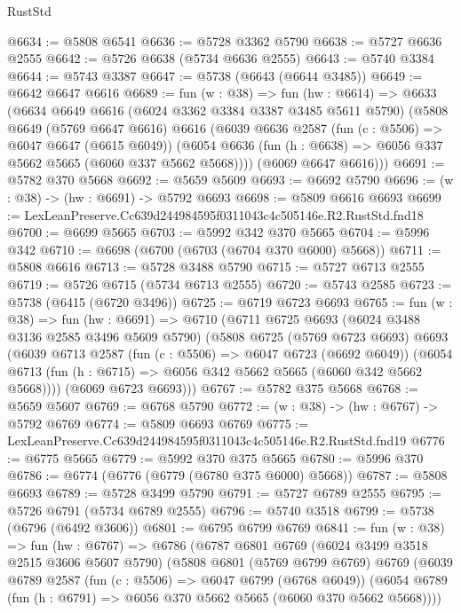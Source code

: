 \begin{lexlean}{RustStd}
\begin{coremodule}
@6634 := @5808 @6541
@6636 := @5728 @3362 @5790
@6638 := @5727 @6636 @2555
@6642 := @5726 @6638 (@5734 @6636 @2555)
@6643 := @5740 @3384
@6644 := @5743 @3387
@6647 := @5738 (@6643 (@6644 @3485))
@6649 := @6642 @6647 @6616
@6689 := fun (w : @38) =>
  fun (hw : @6614) =>
  @6633
    (@6634
      @6649
      @6616
      (@6024 @3362 @3384 @3387 @3485 @5611 @5790)
      (@5808
        @6649
        (@5769 @6647 @6616)
        @6616
        (@6039
          @6636
          @2587
          (fun (c : @5506) => @6047 @6647 (@6615 @6049))
          (@6054 @6636 (fun (h : @6638) => @6056 @337 @5662 @5665 (@6060 @337 @5662 @5668))))
        (@6069 @6647 @6616)))
@6691 := @5782 @370 @5668
@6692 := @5659 @5609
@6693 := @6692 @5790
@6696 := (w : @38) -> (hw : @6691) -> @5792 @6693
@6698 := @5809 @6616 @6693
@6699 := LexLeanPreserve.Cc639d244984595f0311043c4c505146e.R2.RustStd.fnd18
@6700 := @6699 @5665
@6703 := @5992 @342 @370 @5665
@6704 := @5996 @342
@6710 := @6698 (@6700 (@6703 (@6704 @370 @6000) @5668))
@6711 := @5808 @6616
@6713 := @5728 @3488 @5790
@6715 := @5727 @6713 @2555
@6719 := @5726 @6715 (@5734 @6713 @2555)
@6720 := @5743 @2585
@6723 := @5738 (@6415 (@6720 @3496))
@6725 := @6719 @6723 @6693
@6765 := fun (w : @38) =>
  fun (hw : @6691) =>
  @6710
    (@6711
      @6725
      @6693
      (@6024 @3488 @3136 @2585 @3496 @5609 @5790)
      (@5808
        @6725
        (@5769 @6723 @6693)
        @6693
        (@6039
          @6713
          @2587
          (fun (c : @5506) => @6047 @6723 (@6692 @6049))
          (@6054 @6713 (fun (h : @6715) => @6056 @342 @5662 @5665 (@6060 @342 @5662 @5668))))
        (@6069 @6723 @6693)))
@6767 := @5782 @375 @5668
@6768 := @5659 @5607
@6769 := @6768 @5790
@6772 := (w : @38) -> (hw : @6767) -> @5792 @6769
@6774 := @5809 @6693 @6769
@6775 := LexLeanPreserve.Cc639d244984595f0311043c4c505146e.R2.RustStd.fnd19
@6776 := @6775 @5665
@6779 := @5992 @370 @375 @5665
@6780 := @5996 @370
@6786 := @6774 (@6776 (@6779 (@6780 @375 @6000) @5668))
@6787 := @5808 @6693
@6789 := @5728 @3499 @5790
@6791 := @5727 @6789 @2555
@6795 := @5726 @6791 (@5734 @6789 @2555)
@6796 := @5740 @3518
@6799 := @5738 (@6796 (@6492 @3606))
@6801 := @6795 @6799 @6769
@6841 := fun (w : @38) =>
  fun (hw : @6767) =>
  @6786
    (@6787
      @6801
      @6769
      (@6024 @3499 @3518 @2515 @3606 @5607 @5790)
      (@5808
        @6801
        (@5769 @6799 @6769)
        @6769
        (@6039
          @6789
          @2587
          (fun (c : @5506) => @6047 @6799 (@6768 @6049))
          (@6054 @6789 (fun (h : @6791) => @6056 @370 @5662 @5665 (@6060 @370 @5662 @5668))))

\end{coremodule}
\end{lexlean}
